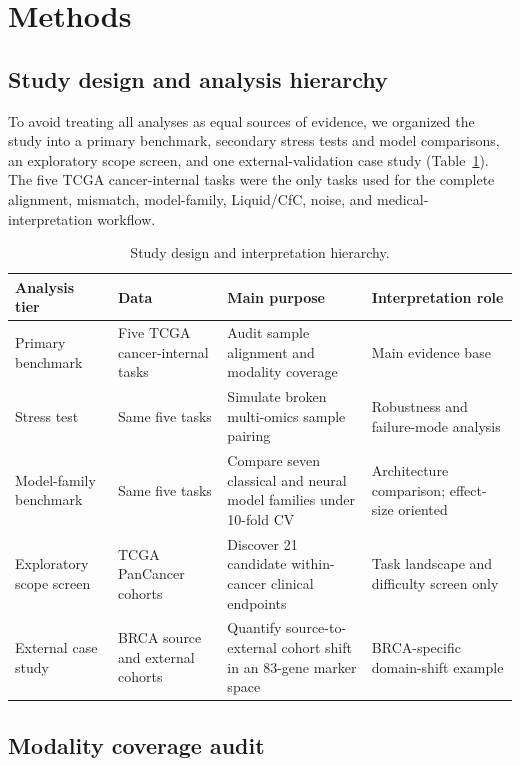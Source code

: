 \section{Methods}

\subsection{Study design and analysis hierarchy}

To avoid treating all analyses as equal sources of evidence, we organized the study into a primary benchmark, secondary stress tests and model comparisons, an exploratory scope screen, and one external-validation case study (Table~\ref{tab:study_design}). The five TCGA cancer-internal tasks were the only tasks used for the complete alignment, mismatch, model-family, Liquid/CfC, noise, and medical-interpretation workflow.

\begin{table}[ht]
\centering
\caption{Study design and interpretation hierarchy.}
\label{tab:study_design}
\begingroup
\footnotesize
\setlength{\tabcolsep}{3pt}
\begin{tabular}{>{\raggedright\arraybackslash}p{}>{\raggedright\arraybackslash}p{}>{\raggedright\arraybackslash}p{}>{\raggedright\arraybackslash}p{}}
\toprule
Analysis tier & Data & Main purpose & Interpretation role \\
\midrule
Primary benchmark & Five TCGA cancer-internal tasks & Audit sample alignment and modality coverage & Main evidence base \\
Stress test & Same five tasks & Simulate broken multi-omics sample pairing & Robustness and failure-mode analysis \\
Model-family benchmark & Same five tasks & Compare seven classical and neural model families under 10-fold CV & Architecture comparison; effect-size oriented \\
Exploratory scope screen & 10 TCGA PanCancer cohorts & Discover 21 candidate within-cancer clinical endpoints & Task landscape and difficulty screen only \\
External case study & BRCA source and external cohorts & Quantify source-to-external cohort shift in an 83-gene marker space & BRCA-specific domain-shift example \\
\bottomrule
\end{tabular}
\endgroup
\end{table}

\subsection{Modality coverage audit}

